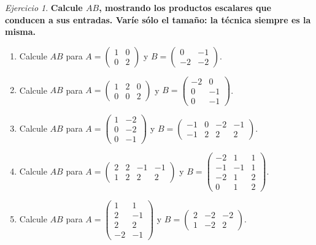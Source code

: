 \documentclass[12pt]{article}
\theoremstyle{remark}
\newtheorem{Ejer}[definicion]{Ejercicio}
\begin{document}
\begin{Ejer}

\textbf{Calcule $AB$, mostrando los productos escalares que conducen a sus entradas. Varíe sólo el tamaño: la técnica siempre es la misma.}
\begin{enumerate}[start=113]

\item Calcule $AB$ para $A=\begin{pmatrix}1&0\\0&2\end{pmatrix}$ y $B=\begin{pmatrix}0&-1\\-2&-2\end{pmatrix}$.

\item Calcule $AB$ para $A=\begin{pmatrix}1&2&0\\0&0&2\end{pmatrix}$ y $B=\begin{pmatrix}-2&0\\0&-1\\0&-1\end{pmatrix}$.

\item Calcule $AB$ para $A=\begin{pmatrix}1&-2\\0&-2\\0&-1\end{pmatrix}$ y $B=\begin{pmatrix}-1&0&-2&-1\\-1&2&2&2\end{pmatrix}$.

\item Calcule $AB$ para $A=\begin{pmatrix}2&2&-1&-1\\1&2&2&2\end{pmatrix}$ y $B=\begin{pmatrix}-2&1&1\\-1&-1&1\\-2&1&2\\0&1&2\end{pmatrix}$.

\item Calcule $AB$ para $A=\begin{pmatrix}1&1\\2&-1\\2&2\\-2&-1\end{pmatrix}$ y $B=\begin{pmatrix}2&-2&-2\\1&-2&2\end{pmatrix}$.


\end{enumerate}
\end{Ejer}
\end{document}
